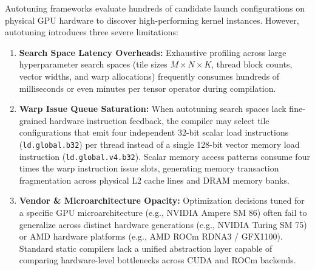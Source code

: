 \documentclass[10pt,journal,compsoc]{IEEEtran}
\begin{document}
Autotuning frameworks evaluate hundreds of candidate launch configurations on physical GPU hardware to discover high-performing kernel instances. However, autotuning introduces three severe limitations:
\begin{enumerate}
    \item \textbf{Search Space Latency Overheads:} Exhaustive profiling across large hyperparameter search spaces (tile sizes $M \times N \times K$, thread block counts, vector widths, and warp allocations) frequently consumes hundreds of milliseconds or even minutes per tensor operator during compilation.
    \item \textbf{Warp Issue Queue Saturation:} When autotuning search spaces lack fine-grained hardware instruction feedback, the compiler may select tile configurations that emit four independent 32-bit scalar load instructions (\texttt{ld.global.b32}) per thread instead of a single 128-bit vector memory load instruction (\texttt{ld.global.v4.b32}). Scalar memory access patterns consume four times the warp instruction issue slots, generating memory transaction fragmentation across physical L2 cache lines and DRAM memory banks.
    \item \textbf{Vendor \& Microarchitecture Opacity:} Optimization decisions tuned for a specific GPU microarchitecture (e.g., NVIDIA Ampere SM 86) often fail to generalize across distinct hardware generations (e.g., NVIDIA Turing SM 75) or AMD hardware platforms (e.g., AMD ROCm RDNA3 / GFX1100). Standard static compilers lack a unified abstraction layer capable of comparing hardware-level bottlenecks across CUDA and ROCm backends.
\end{enumerate}
\end{document}
